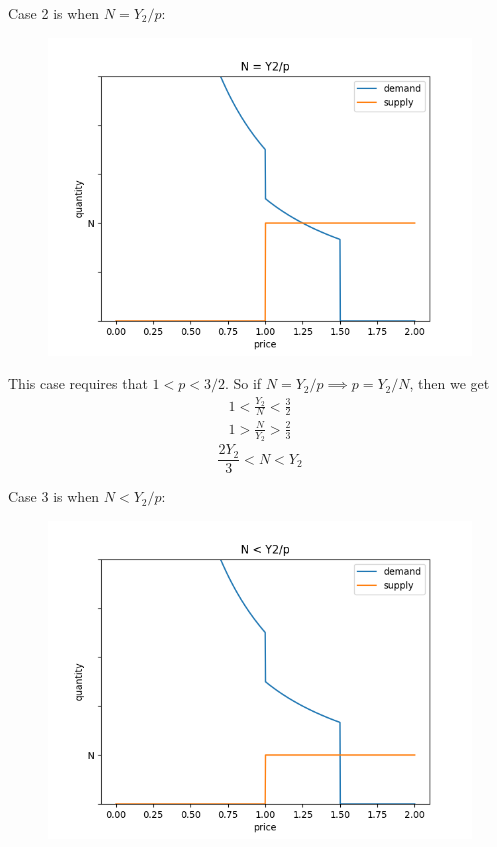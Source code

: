 \documentclass[11pt]{article}
\begin{document}
\newpage
Case 2 is when $N = Y_2/p$:

\begin{figure}[h]
    \centering
    \includegraphics*[width=4.5in]{equilibrium2.png}
    \label{fig:equ2}
\end{figure}
\FloatBarrier


This case requires that $1 < p < 3/2$. So if $N =  Y_2/p \implies p = Y_2/N$, then we get 
\begin{align*}
    1 < \frac{Y_2}{N} < \frac{3}{2}  \\
    1 > \frac{N}{Y_2} > \frac{2}{3}
\end{align*}
\begin{equation}
    \frac{2Y_2}{3} < N < Y_2
\end{equation}

\newpage
Case 3 is when $N < Y_2/p$:
\begin{figure}[h]
    \centering
    \includegraphics*[width=4.5in]{equilibrium3.png}
    \label{fig:equ3}
\end{figure}
\FloatBarrier
\end{document}
